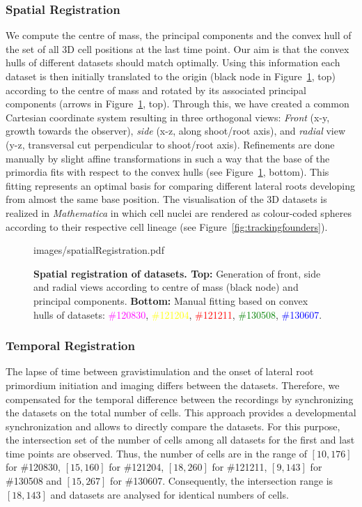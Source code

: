 \documentclass[11pt,a4paper, final]{article}
\begin{document}
\subsubsection{Spatial Registration}
\noindent
We compute the centre of mass, the principal components and the convex hull of the set of all 3D cell positions at the last time point. Our aim is that the convex hulls of different datasets should match optimally. Using this information each dataset is then initially translated to the origin (black node in Figure~\ref{fig:spatialRegistration}, top) according to the centre of mass and rotated by its associated principal components (arrows in Figure~\ref{fig:spatialRegistration}, top). Through this, we have created a common Cartesian coordinate system resulting in three orthogonal views: \textit{Front} (x-y, growth towards the observer), \textit{side} (x-z, along shoot/root axis), and \textit{radial} view (y-z, transversal cut perpendicular to shoot/root axis). Refinements are done manually by slight affine transformations in such a way that the base of the primordia fits with respect to the convex hulls (see Figure~\ref{fig:spatialRegistration}, bottom). This fitting represents an optimal basis for comparing different lateral roots developing from almost the same base position. The visualisation of the 3D datasets is realized in \textit{Mathematica} in which cell nuclei are rendered as
colour-coded spheres according to their respective cell lineage (see Figure~\ref{fig:trackingfounders}).
%
\begin{figure}[htbp]
	\begin{center}
		\begin{overpic}[width=1.\linewidth]{images/spatialRegistration.pdf}
		\end{overpic}
\caption[]
{
{\bf Spatial registration of datasets. Top:} Generation of front, side and radial views according to centre of mass (black node) and principal components. {\bf Bottom:} Manual fitting based on convex hulls of datasets: \textcolor{magenta}{\#120830}, \textcolor{yellow}{\#121204}, \textcolor{red}{\#121211}, \textcolor{green}{\#130508}, \textcolor{blue}{\#130607}.
}
	\label{fig:spatialRegistration}
	\end{center}
\end{figure}
%

\subsubsection{Temporal Registration}
\noindent
The lapse of time between gravistimulation and the onset of lateral root primordium initiation and imaging differs between the datasets. Therefore, we compensated for the temporal difference between the recordings by synchronizing the datasets on the total number of cells. This approach provides a developmental synchronization and allows to directly compare the datasets. For this purpose, the intersection set of the number of cells among all datasets for the first and last time points are observed. Thus, the number of cells are in the range of $[10,176]$ for \#120830, $[15,160]$ for \#121204, $[18,260]$ for \#121211, $[9,143]$ for \#130508 and $[15,267]$ for \#130607. Consequently, the intersection range is $[18, 143]$ and datasets are analysed for identical numbers of cells.
\end{document}

